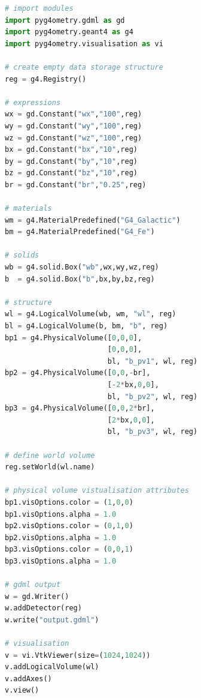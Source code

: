 \documentclass[final,5p,times,twocolumn]{elsarticle}
\newcommand{\PYGEOMETRY}{\textsc{Pyg4ometry}}
\begin{document}
\begin{lstlisting}[caption={A simple Python script using \PYGEOMETRY{} to create a simple Geant4 geometry.},label={lst:pythonRapidModelling}, language=Python]
# import modules 
import pyg4ometry.gdml as gd
import pyg4ometry.geant4 as g4
import pyg4ometry.visualisation as vi

# create empty data storage structure
reg = g4.Registry()

# expressions
wx = gd.Constant("wx","100",reg)
wy = gd.Constant("wy","100",reg)
wz = gd.Constant("wz","100",reg)
bx = gd.Constant("bx","10",reg)
by = gd.Constant("by","10",reg)
bz = gd.Constant("bz","10",reg)
br = gd.Constant("br","0.25",reg)

# materials
wm = g4.MaterialPredefined("G4_Galactic")
bm = g4.MaterialPredefined("G4_Fe")

# solids
wb = g4.solid.Box("wb",wx,wy,wz,reg)
b  = g4.solid.Box("b",bx,by,bz,reg)

# structure
wl = g4.LogicalVolume(wb, wm, "wl", reg)
bl = g4.LogicalVolume(b, bm, "b", reg)
bp1 = g4.PhysicalVolume([0,0,0],
                        [0,0,0],
                        bl, "b_pv1", wl, reg)
bp2 = g4.PhysicalVolume([0,0,-br],
                        [-2*bx,0,0],
                        bl, "b_pv2", wl, reg)
bp3 = g4.PhysicalVolume([0,0,2*br],
                        [2*bx,0,0],
                        bl, "b_pv3", wl, reg)

# define world volume
reg.setWorld(wl.name)

# physical volume vistualisation attributes
bp1.visOptions.color = (1,0,0)
bp1.visOptions.alpha = 1.0
bp2.visOptions.color = (0,1,0)
bp2.visOptions.alpha = 1.0
bp3.visOptions.color = (0,0,1)
bp3.visOptions.alpha = 1.0

# gdml output
w = gd.Writer()
w.addDetector(reg)
w.write("output.gdml")

# visualisation
v = vi.VtkViewer(size=(1024,1024))
v.addLogicalVolume(wl)
v.addAxes()
v.view()
\end{lstlisting}
\end{document}
